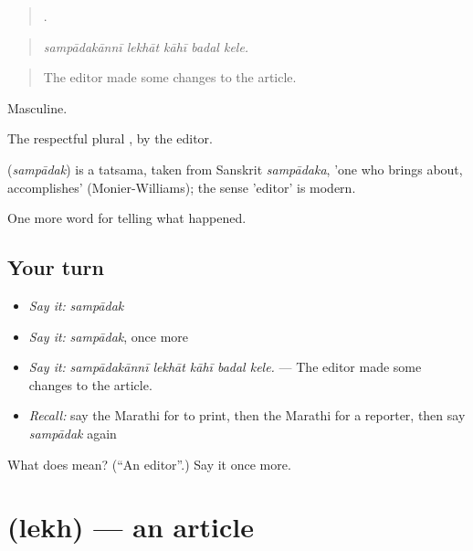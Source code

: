 \begin{quote}
    .
\end{quote}

\begin{quote}
\emph{sampādakānnī lekhāt kāhī badal kele.}
\end{quote}

\begin{quote}
The editor made some changes to the article.
\end{quote}

Masculine.

The respectful plural , by the editor.

\begin{cousinweb}
\textbf{} (\emph{sampādak}) is a tatsama, taken from Sanskrit \emph{sampādaka}, 'one who brings about, accomplishes' (Monier-Williams); the sense 'editor' is modern.
\end{cousinweb}

\begin{grammarlens}[title={What you've built}]
One more word for telling what happened.
\end{grammarlens}

\subsection*{Your turn}
\begin{itemize}
\raggedright
  \item \emph{Say it:} \emph{sampādak}
  \item \emph{Say it:} \emph{sampādak}, once more
  \item \emph{Say it:} \emph{sampādakānnī lekhāt kāhī badal kele.} — The editor made some changes to the article.
  \item \emph{Recall:} say the Marathi for to print, then the Marathi for a reporter, then say \emph{sampādak} again
\end{itemize}

\begin{tcolorbox}[breakable,colback=teal!4,colframe=teal!35!black,title={Before you move on}]
What does  mean? (\textquotedblleft{}An editor\textquotedblright{}.) Say it once more.
\end{tcolorbox}
\section[\texorpdfstring{\mr{लेख} (lekh)}{लेख (lekh)}]{ (lekh) — an article}

